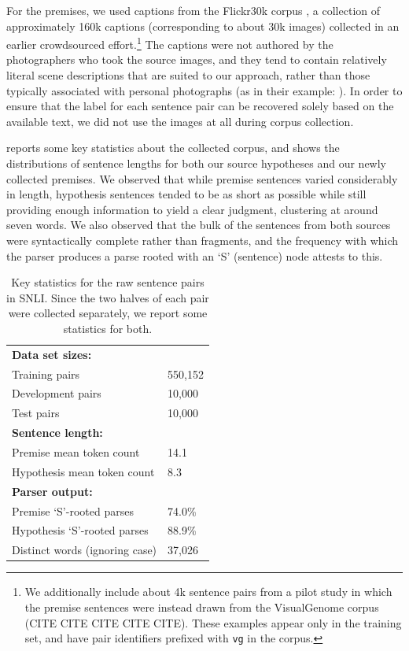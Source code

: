 For the premises, we used captions from the Flickr30k corpus \cite{hodoshimage}, a collection of approximately 160k captions (corresponding to about 30k images) collected in an earlier crowdsourced effort.\footnote{
We additionally include about 4k sentence pairs from a pilot study in which the premise sentences were instead drawn from the VisualGenome corpus (CITE CITE CITE CITE CITE). These examples appear only in the training set, and have pair identifiers prefixed with \texttt{vg} in the corpus.
 } 
The captions were not authored by the photographers who took the source images, and they tend to contain relatively literal scene descriptions that are suited to our approach, rather than those typically associated with personal photographs (as in their example: ). In order to ensure that the label for each sentence pair can be recovered solely based on the available text, we did not use the images at all during corpus collection.

 reports some key statistics about the collected corpus, and  shows the distributions of sentence lengths for both our source hypotheses and our newly collected premises. We observed that while premise sentences varied considerably in length, hypothesis sentences tended to be as short as possible while still providing enough information to yield a clear judgment, clustering at around seven words. We also observed that the bulk of the sentences from both sources were syntactically complete rather than fragments, and the frequency with which the parser produces a parse rooted with an `S' (sentence) node attests to this.

\begin{table}
\center
  \begin{tabular}{l l} 
    \toprule
\multicolumn{2}{l}{\textbf{Data set sizes:}}\\
Training pairs &  550,152\\
Development pairs &  10,000\\
Test pairs & 10,000\\
\midrule
\multicolumn{2}{l}{\textbf{Sentence length:}}\\
Premise mean token count & 14.1\\
Hypothesis mean token count & 8.3 \\
\midrule
\multicolumn{2}{l}{\textbf{Parser output:}}\\
Premise `S'-rooted parses & 74.0\%\\
Hypothesis `S'-rooted parses & 88.9\%\\
Distinct words (ignoring case) & 37,026\\
    \bottomrule
  \end{tabular}
\caption{\label{collection-stats}Key statistics for the raw sentence pairs in SNLI. Since the two halves of each pair were collected separately, we report some statistics for both.} 
\end{table}


